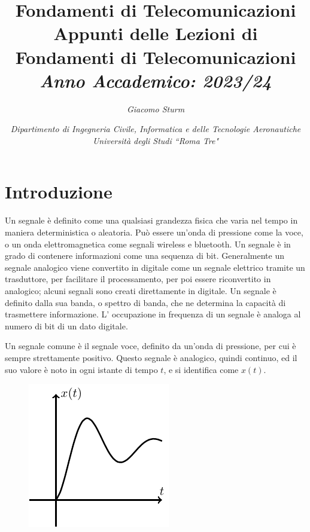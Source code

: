 \documentclass{article}
\numberwithin{equation}{subsection}
\begin{document}
\title{%
    \textbf{Fondamenti di Telecomunicazioni}  \\ 
    \large Appunti delle Lezioni di Fondamenti di Telecomunicazioni\\
    \textit{Anno Accademico: 2023/24}}
\author{\textit{Giacomo Sturm}}
\date{\textit{Dipartimento di Ingegneria Civile, Informatica e delle Tecnologie Aeronautiche \\
Università degli Studi ``Roma Tre"}}

\maketitle
\thispagestyle{link}


\clearpage

\pagestyle{fancy}
\fancyhead{}\fancyfoot{}
\fancyfoot[C]{\thepage}

\tableofcontents

\clearpage



\section{Introduzione}

Un segnale è definito come una qualsiasi grandezza fisica che varia nel tempo in maniera deterministica o aleatoria. Può essere un'onda di pressione come la voce, o un onda 
elettromagnetica come segnali wireless e bluetooth. Un segnale è in grado di contenere informazioni come una sequenza di bit. Generalmente un segnale 
analogico viene convertito in digitale come un segnale elettrico tramite un trasduttore, per facilitare il processamento, per poi essere riconvertito in analogico; alcuni 
segnali sono creati direttamente in digitale. Un segnale è definito dalla sua banda, o spettro di banda, che ne determina la capacità di trasmettere informazione. L' 
occupazione in frequenza di un segnale è analoga al numero di bit di un dato digitale. 



Un segnale comune è il segnale voce, definito da un'onda di pressione, per cui è sempre strettamente positivo. Questo segnale è analogico, quindi continuo, ed il suo valore è 
noto in ogni istante di tempo $t$, e si identifica come $x(t)$. 

\begin{figure}[H]%
    \centering
    \includegraphics{segnale-continuo-1.pdf}%
    \label{fig:segnale-continuo-1}
\end{figure}
\end{document}
